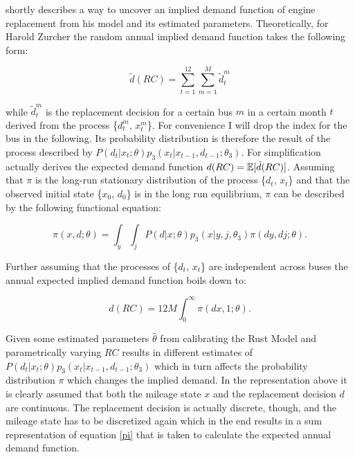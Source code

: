 \cite{Rust.1987} shortly describes a way to uncover an implied demand function of engine replacement from his model and its estimated parameters. Theoretically, for Harold Zurcher the random annual implied demand function takes the following form:

\begin{equation*}
	\tilde{d}(RC) = \sum_{t=1}^{12} \sum_{m=1}^{M} \tilde{d}^m_t
\end{equation*}

while $\tilde{d}^m_t$ is the replacement decision for a certain bus $m$ in a certain month $t$ derived from the process \{$d^m_t$, $x^m_t$\}. For convenience I will drop the index for the bus in the following. Its probability distribution is therefore the result of the process described by $P(d_t|x_t; \theta)p_3(x_t|x_{t-1}, d_{t-1}; \theta_3)$. For simplification \citeauthor{Rust.1987} actually derives the expected demand function $d(RC)=\operatorname*{\mathbb{E}}[\tilde{d}(RC)]$. Assuming that $\pi$ is the long-run stationary distribution of the process \{$d_t$, $x_t$\} and that the observed initial state \{$x_0$, $d_0$\} is in the long run equilibrium, $\pi$ can be described by the following functional equation:

\begin{equation}
	\label{pi}
	\pi(x, d; \theta) = \int_{y} \int_{j} P(d|x; \theta)p_3(x|y, j, \theta_3) \pi(dy, dj; \theta).
\end{equation}

Further assuming that the processes of \{$d_t$, $x_t$\} are independent across buses the annual expected implied demand function boils down to:

\begin{equation}
	\label{demand}
	d(RC) = 12 M \int_{0}^{\infty} \pi(dx, 1; \theta).
\end{equation}

Given some estimated parameters $\hat\theta$ from calibrating the Rust Model and parametrically varying $RC$ results in different estimates of $P(d_t|x_t; \theta)p_3(x_t|x_{t-1}, d_{t-1}; \theta_3)$ which in turn affects the probability distribution $\pi$ which changes the implied demand. In the representation above it is clearly assumed that both the mileage state $x$ and the replacement decision $d$ are continuous. The replacement decision is actually discrete, though, and the mileage state has to be discretized again which in the end results in a sum representation of equation \ref{pi} that is taken to calculate the expected annual demand function.
\paragraph{}

